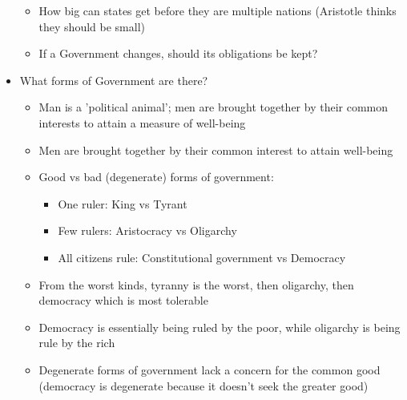 \documentclass[11pt]{article}
\begin{document}
\begin{itemize}
\begin{itemize}
\item How big can states get before they are multiple nations (Aristotle thinks
they should be small)
\item If a Government changes, should its obligations be kept?
\end{itemize}
\item What forms of Government are there?
\begin{itemize}
\item Man is a 'political animal'; men are brought together by their common
interests to attain a measure of well-being
\item Men are brought together by their common interest to attain well-being
\item Good vs bad (degenerate) forms of government:
\begin{itemize}
\item One ruler: King vs Tyrant
\item Few rulers: Aristocracy vs Oligarchy
\item All citizens rule: Constitutional government vs Democracy
\end{itemize}
\item From the worst kinds, tyranny is the worst, then oligarchy, then democracy
which is most tolerable
\item Democracy is essentially being ruled by the poor, while oligarchy is being
rule by the rich
\item Degenerate forms of government lack a concern for the common good (democracy
is degenerate because it doesn't seek the greater good)
\end{itemize}
\end{itemize}
\end{document}
